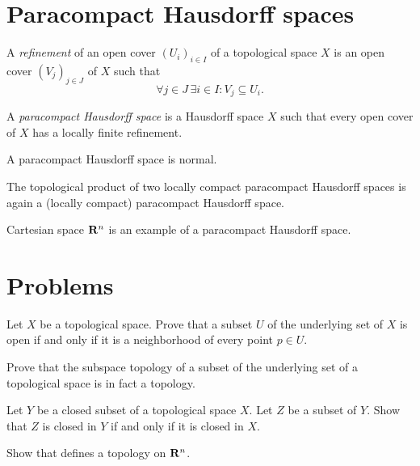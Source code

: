 \section{Paracompact Hausdorff spaces}
\label{sec:paracompactness}

A \emph{refinement} of an open cover $(U_i)_{i \in I}$ of a topological space $X$
is an open cover $(V_j)_{j \in J}$ of $X$ such that
\[
  \forall j \in J \, \exists i \in I: V_j \subseteq U_i.
\]

\begin{dfn}
  A \emph{paracompact Hausdorff space} is a Hausdorff space $X$ such that every
  open cover of $X$ has a locally finite refinement.
\end{dfn}

\begin{prop}
  \label{prop:paracompact_spaces}
  A paracompact Hausdorff space is normal.
\end{prop}

\begin{thm}
  The topological product of two locally compact paracompact Hausdorff spaces
  is again a (locally compact) paracompact Hausdorff space. 
\end{thm}

Cartesian space $\mathbf{R}^n$ is an example of a paracompact Hausdorff space.

\section{Problems}

\begin{xca}
  Let $X$ be a topological space. Prove that a subset $U$ of the underlying set
  of $X$ is open if and only if it is a neighborhood of every point $p \in U$.
\end{xca}

\begin{xca}
  Prove that the subspace topology of a subset of the underlying set of a topological
  space is in fact a topology.
\end{xca}

\begin{xca}
  Let $Y$ be a closed subset of a topological space $X$. Let $Z$ be a subset of
  $Y$. Show that $Z$ is closed in $Y$ if and only if it is closed in $X$.
\end{xca}

\begin{xca}
  Show that  defines a topology on $\mathbf{R}^n$.
\end{xca}

